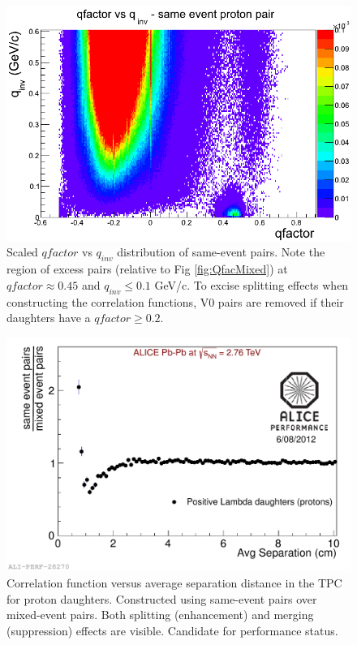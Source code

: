 \begin{figure}[hbtp]
\includegraphics[scale=0.5]{Qfac_SameEvent.png}
\caption[$qfactor$ vs $q_{inv}$ distribution of same-event pairs]{Scaled $qfactor$ vs $q_{inv}$ distribution of same-event pairs.  Note the region of excess pairs (relative to Fig \ref{fig:QfacMixed}) at $qfactor \approx 0.45$ and $q_{inv} \leq 0.1$ GeV/c.  To excise splitting effects when constructing the correlation functions, V0 pairs are removed if their daughters have a $qfactor \geq 0.2$.}
\label{fig:QfacSame}
\end{figure}

\begin{figure}[hbtp]
\includegraphics[scale=0.6]{2012-Aug-07-TwoTrack_Perf.pdf}
\caption[Correlation function showing two-track reconstruction effects]{Correlation function versus average separation distance in the TPC for proton daughters.  Constructed using same-event pairs over mixed-event pairs.  Both splitting (enhancement) and merging (suppression) effects are visible.  Candidate for performance status.}
\label{fig:Merging}
\end{figure}


